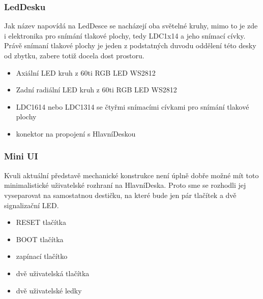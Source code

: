 \subsubsection{LedDesku}
Jak název napovídá na LedDesce se nacházejí oba světelné kruhy, mimo to je zde i elektronika pro snímání tlakové plochy, tedy LDC1x14 \cite{LDC1614} a jeho snímací cívky.
Právě snímaní tlakové plochy je jeden z podstatných duvodu oddělení této desky od zbytku, zabere totiž docela dost prostoru.

\begin{itemize}
    \item Axiální LED kruh z 60ti RGB LED WS2812
    \item Zadní radiální LED kruh z 60ti RGB LED WS2812
    \item LDC1614 nebo LDC1314 se čtyřmi snímacími cívkami pro snímání tlakové plochy
    \item konektor na propojení s HlavníDeskou
\end{itemize}

\subsubsection{Mini UI}
Kvuli aktuální představě mechanické konstrukce není úplně dobře možné mít toto minimalistické uživatelské rozhraní na HlavníDeska.
Proto sme se rozhodli jej vyseparovat na samostatnou destičku, na které bude jen pár tlačítek a dvě signalizační LED.

\begin{itemize}
    \item RESET tlačítka
    \item BOOT tlačítka
    \item zapínací tlačítko
    \item dvě uživatelská tlačítka 
    \item dvě uživatelské ledky
\end{itemize}

